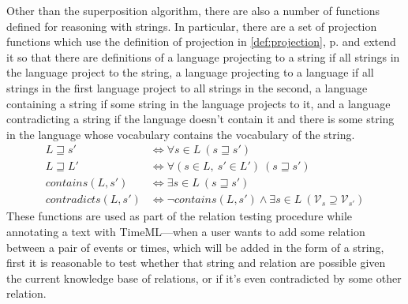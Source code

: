 \documentclass[a4paper,12pt,leqno,twoside]{article}
\newcommand{\sensp}{~\hat{\&}~}
\newcommand{\spvc}{~\&_{v\!c}~}
\newcommand{\V}{\mathcal{V}}
\begin{document}
Other than the superposition algorithm, there are also a number of functions defined for reasoning with strings. In particular, there are a set of projection functions which use the definition of projection in \cref{def:projection}, p. \pageref{def:projection} and extend it so that there are definitions of a language projecting to a string if all strings in the language project to the string, a language projecting to a language if all strings in the first language project to all strings in the second, a language containing a string if some string in the language projects to it, and a language contradicting a string if the language doesn't contain it and there is some string in the language whose vocabulary contains the vocabulary of the string.
\begin{align}
	L \sqsupseteq s' &\Longleftrightarrow \forall s \in L ~(s \sqsupseteq s')\\
	L \sqsupseteq L' &\Longleftrightarrow \forall (s \in L,~ s' \in L')~(s \sqsupseteq s')\\
	contains(L, s') &\Longleftrightarrow \exists s \in L ~(s \sqsupseteq s')\\
	contradicts(L, s') &\Longleftrightarrow \lnot contains(L, s') \land \exists s \in L ~(\V_s \supseteq \V_{s'})
\end{align}
These functions are used as part of the relation testing procedure while annotating a text with TimeML---when a user wants to add some relation between a pair of events or times, which will be added in the form of a string, first it is reasonable to test whether that string and relation are possible given the current knowledge base of relations, or if it's even contradicted by some other relation.
\end{document}
